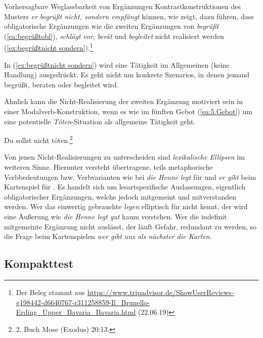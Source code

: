 \begin{Exkurs}{Vorhersagbare Weglassbarkeit von Ergänzungen}
Kontrastkonstruktionen des Musters \textit{er begrüßt nicht, sondern empfängt} können, wie \citet[23--24]{Pasch1977} zeigt, dazu führen, dass obligatorische Ergänzungen wie die zweiten Ergänzungen von \textit{begrüßt} (\ref{ea:begrüßtobl}), \textit{schlägt vor}, \textit{berät} und \textit{begleitet} nicht realisiert werden (\ref{ex:begrüßtnicht sondern}).\footnote{Der Beleg stammt aus \url{https://www.tripadvisor.de/ShowUserReviews-g198442-d6640767-r311258859-Il_Brunello-Erding_Upper_Bavaria_Bavaria.html} (22.06.19)}

\ea \label{ea:Kontrast}
\label{ea:begrüßtobl} 
\label{ex:begrüßtnicht sondern}
\z 
\z 

In (\ref{ex:begrüßtnicht sondern}) wird eine  Tätigkeit im Allgemeinen (keine Handlung) ausgedrückt. Es geht nicht um konkrete Szenarios, in denen jemand begrüßt, beraten oder begleitet wird. 

Ähnlich kann die Nicht-Realisierung der zweiten Ergänzung motiviert sein in einer Modalverb-Konstruktion, wenn es wie im fünften Gebot (\ref{ea:5.Gebot}) um eine potentielle \textit{Töten}-Situation als allgemeine Tätigkeit geht.

\ea \label{ea:5.Gebot} Du sollst nicht töten.\footnote{2. Buch Mose (Exodus) 20:13.}
\z 
 

Von jenen Nicht-Realisierungen zu unterscheiden sind \textit{lexikalische Ellipsen} im weiteren Sinne. Hierunter versteht \citet[35--37]{Agel1991} übertragene, teils metaphorische Verbbedeutungen bzw. Verbvarianten wie bei \textit{die Henne legt} für  und \textit{er gibt} beim Kartenspiel für . Es handelt sich um lesartspezifische Auslassungen, eigentlich obligatorischer Ergänzungen, welche jedoch mitgemeint und mitverstanden werden. Wer das einwertig gebrauchte \textit{legen} elliptisch für  nicht kennt, der wird eine Äußerung wie \textit{die Henne legt gut} kaum verstehen. Wer die indefinit mitgemeinte Ergänzung nicht auslässt, der läuft Gefahr, redundant zu werden, so \zB die Frage beim Kartenspielen \textit{wer gibt uns als nächster die Karten}. 

    
\end{Exkurs}


\subsection{Kompakttest}\label{subsubsection:ZusammenspielTest}

